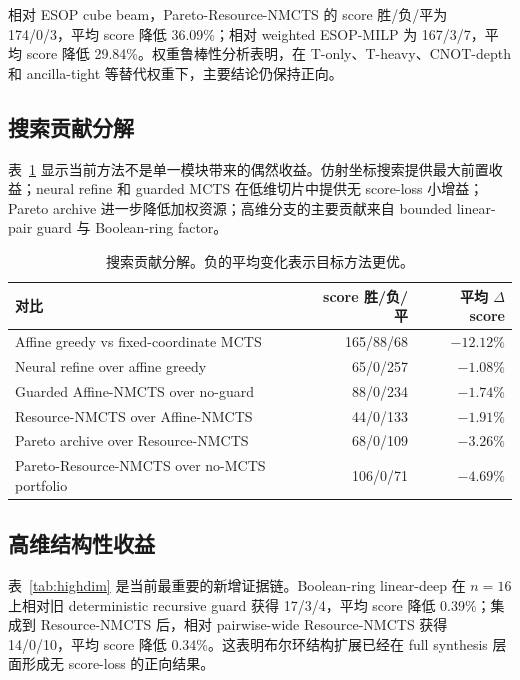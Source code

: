 \documentclass[UTF8,fontset=macnew,11pt]{ctexart}
\newcommand{\method}{Resource-NMCTS}
\newcommand{\pareto}{Pareto-Resource-NMCTS}
\newcommand{\mcts}{\ensuremath{\mathrm{MCTS}}}
\begin{document}
相对 ESOP cube beam，\pareto{} 的 score 胜/负/平为 174/0/3，平均 score 降低 36.09\%；相对 weighted ESOP-MILP 为 167/3/7，平均 score 降低 29.84\%。权重鲁棒性分析表明，在 T-only、T-heavy、CNOT-depth 和 ancilla-tight 等替代权重下，主要结论仍保持正向。

\subsection{搜索贡献分解}

表~\ref{tab:contribution} 显示当前方法不是单一模块带来的偶然收益。仿射坐标搜索提供最大前置收益；neural refine 和 guarded \mcts{} 在低维切片中提供无 score-loss 小增益；Pareto archive 进一步降低加权资源；高维分支的主要贡献来自 bounded linear-pair guard 与 Boolean-ring factor。

\begin{table}[t]
\centering
\small
\caption{搜索贡献分解。负的平均变化表示目标方法更优。}
\label{tab:contribution}
\begin{tabularx}{\linewidth}{>{\raggedright\arraybackslash}Xrr}
\toprule
对比 & score 胜/负/平 & 平均 $\Delta$ score \\
\midrule
Affine greedy vs fixed-coordinate MCTS & 165/88/68 & $-12.12\%$ \\
Neural refine over affine greedy & 65/0/257 & $-1.08\%$ \\
Guarded Affine-NMCTS over no-guard & 88/0/234 & $-1.74\%$ \\
\method{} over Affine-NMCTS & 44/0/133 & $-1.91\%$ \\
Pareto archive over \method{} & 68/0/109 & $-3.26\%$ \\
\pareto{} over no-MCTS portfolio & 106/0/71 & $-4.69\%$ \\
\bottomrule
\end{tabularx}
\end{table}

\subsection{高维结构性收益}

表~\ref{tab:highdim} 是当前最重要的新增证据链。Boolean-ring linear-deep 在 $n=16$ 上相对旧 deterministic recursive guard 获得 17/3/4，平均 score 降低 0.39\%；集成到 \method{} 后，相对 pairwise-wide \method{} 获得 14/0/10，平均 score 降低 0.34\%。这表明布尔环结构扩展已经在 full synthesis 层面形成无 score-loss 的正向结果。
\end{document}
